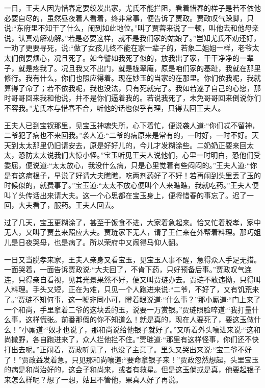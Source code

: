\begin{parag}
    一日，王夫人因为惜春定要绞发出家，尤氏不能拦阻，看着惜春的样子是若不依他必要自尽的，虽然昼夜着人看着，终非常事，便告诉了贾政。贾政叹气跺脚，只说:“东府里不知干了什么，闹到如此地位。”叫了贾蓉来说了一顿，叫他去和他母亲说，认真劝解劝解。”若是必要这样，就不是我们家的姑娘了。”岂知尤氏不劝还好，一劝了更要寻死，说:“做了女孩儿终不能在家一辈子的，若象二姐姐一样，老爷太太们倒要烦心，况且死了。如今譬如我死了似的，放我出了家，干干净净的一辈子，就是疼我了。况且我又不出门，就是栊翠庵，原是咱们家的基趾，我就在那里修行。我有什么，你们也照应得着。现在妙玉的当家的在那里。你们依我呢，我就算得了命了；若不依我呢，我也没法，只有死就完了。我如若遂了自己的心愿，那时哥哥回来我和他说，并不是你们逼着我的。若说我死了，未免哥哥回来倒说你们不容我。”尤氏本与惜春不合，听他的话也似乎有理，只得去回王夫人。
\end{parag}


\begin{parag}
    王夫人已到宝钗那里，见宝玉神魂失所，心下着忙，便说袭人道:“你们忒不留神，二爷犯了病也不来回我。”袭人道:“二爷的病原来是常有的，一时好，一时不好。天天到太太那里仍旧请安去，原是好好儿的，今儿才发糊涂些。二奶奶正要来回太太，恐防太太说我们大惊小怪。”宝玉听见王夫人说他们，心里一时明白，恐他们受委屈，便说道:“太太放心，我没什么病，只是心里觉着有些闷闷的。”王夫人道:“你是有这病根子，早说了好请大夫瞧瞧，吃两剂药好了不好！若再闹到头里丢了玉的时候似的，就费事了。”宝玉道:“太太不放心便叫个人来瞧瞧，我就吃药。”王夫人便叫丫头传话出来请大夫。这一个心思都在宝玉身上，便将惜春的事忘了。迟了一回，大夫看了，服药。王夫人回去。
\end{parag}


\begin{parag}
    过了几天，宝玉更糊涂了，甚至于饭食不进，大家着急起来。恰又忙着脱孝，家中无人，又叫了贾芸来照应大夫。贾琏家下无人，请了王仁来在外帮着料理。那巧姐儿是日夜哭母，也是病了。所以荣府中又闹得马仰人翻。
\end{parag}


\begin{parag}
    一日又当脱孝来家，王夫人亲身又看宝玉，见宝玉人事不醒，急得众人手足无措。一面哭着，一面告诉贾政说:“大夫回了，不肯下药，只好预备后事。”贾政叹气连连，只得亲自看视，见其光景果然不好，便又叫贾琏办去。贾琏不敢违拗，只得叫人料理。手头又短，正在为难，只见一个人跑进来说:“二爷，不好了，又有饥荒来了。”贾琏不知何事，这一唬非同小可，瞪着眼说道:“什么事？”那小厮道:“门上来了一个和尚，手里拿着二爷的这块丢的玉，说要一万赏银。”贾琏照脸啐道:“我打量什么事，这样慌张。前番那假的你不知道么！就是真的，现在人要死了，要这玉做什么！”小厮道:“奴才也说了，那和尚说给他银子就好了。”又听着外头嚷进来说:“这和尚撒野，各自跑进来了，众人拦他拦不住。”贾琏道:“那里有这样怪事，你们还不快打出去呢。”正闹着，贾政听见了，也没了主意了。里头又哭出来说:“宝二爷不好了！”贾政益发着急。只见那和尚嚷道:“要命拿银子来！”贾政忽然想起，头里宝玉的病是和尚治好的，这会子和尚来，或者有救星。但是这玉倘或是真，他要起银子来怎么样呢？想了一想，姑且不管他，果真人好了再说。
\end{parag}


